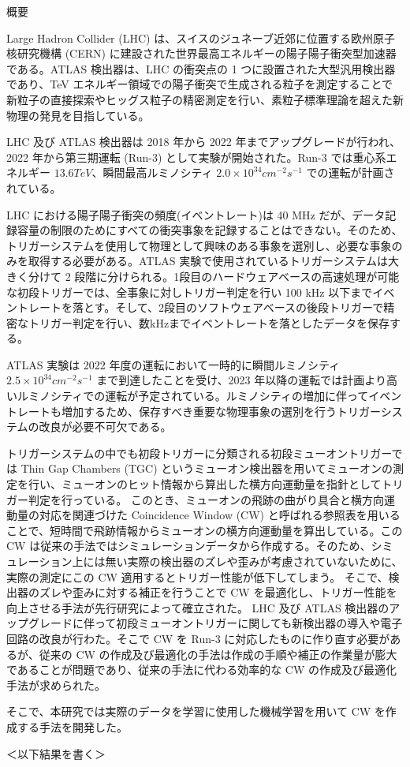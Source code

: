 \begin{center}
  \begin{huge}
    概要
  \end{huge}
\end{center}

\vspace{10pt}

Large Hadron Collider (LHC) は、スイスのジュネーブ近郊に位置する欧州原子核研究機構 (CERN) に建設された世界最高エネルギーの陽子陽子衝突型加速器である。ATLAS 検出器は、LHC の衝突点の 1 つに設置された大型汎用検出器であり、TeV エネルギー領域での陽子衝突で生成される粒子を測定することで新粒子の直接探索やヒッグス粒子の精密測定を行い、素粒子標準理論を超えた新物理の発見を目指している。

LHC 及び ATLAS 検出器は 2018 年から 2022 年までアップグレードが行われ、2022 年から第三期運転 (Run-3) として実験が開始された。Run-3 では重心系エネルギー $13.6 TeV$、瞬間最高ルミノシティ $2.0\times10^{34} cm^{−2}s^{−1}$ での運転が計画されている。

LHC における陽子陽子衝突の頻度(イベントレート)は 40 MHz だが、データ記録容量の制限のためにすべての衝突事象を記録することはできない。そのため、トリガーシステムを使用して物理として興味のある事象を選別し、必要な事象のみを取得する必要がある。ATLAS 実験で使用されているトリガーシステムは大きく分けて 2 段階に分けられる。1段目のハードウェアベースの高速処理が可能な初段トリガーでは、全事象に対しトリガー判定を行い 100 kHz 以下までイベントレートを落とす。そして、2段目のソフトウェアベースの後段トリガーで精密なトリガー判定を行い、数kHzまでイベントレートを落としたデータを保存する。

ATLAS 実験は 2022 年度の運転において一時的に瞬間ルミノシティ $2.5\times10^{34} cm^{−2}s^{−1}$ まで到達したことを受け、2023 年以降の運転では計画より高いルミノシティでの運転が予定されている。ルミノシティの増加に伴ってイベントレートも増加するため、保存すべき重要な物理事象の選別を行うトリガーシステムの改良が必要不可欠である。

トリガーシステムの中でも初段トリガーに分類される初段ミューオントリガーでは Thin Gap Chambers (TGC) というミューオン検出器を用いてミューオンの測定を行い、ミューオンのヒット情報から算出した横方向運動量を指針としてトリガー判定を行っている。
このとき、ミューオンの飛跡の曲がり具合と横方向運動量の対応を関連づけた Coincidence Window (CW) と呼ばれる参照表を用いることで、短時間で飛跡情報からミューオンの横方向運動量を算出している。この CW は従来の手法ではシミュレーションデータから作成する。そのため、シミュレーション上には無い実際の検出器のズレや歪みが考慮されていないために、実際の測定にこの CW 適用するとトリガー性能が低下してしまう。
そこで、検出器のズレや歪みに対する補正を行うことで CW を最適化し、トリガー性能を向上させる手法が先行研究によって確立された。
LHC 及び ATLAS 検出器のアップグレードに伴って初段ミューオントリガーに関しても新検出器の導入や電子回路の改良が行わた。そこで CW を Run-3 に対応したものに作り直す必要があるが、従来の CW の作成及び最適化の手法は作成の手順や補正の作業量が膨大であることが問題であり、従来の手法に代わる効率的な CW の作成及び最適化手法が求められた。

そこで、本研究では実際のデータを学習に使用した機械学習を用いて CW を作成する手法を開発した。

＜以下結果を書く＞

